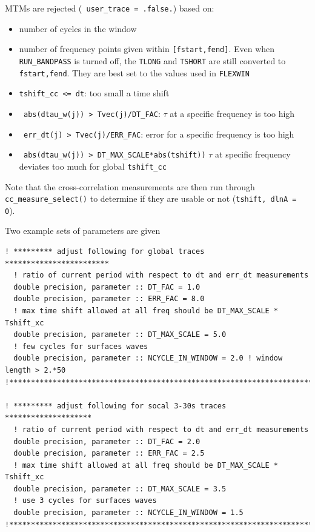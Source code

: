 \documentclass[11pt,titlepage,fleqn]{article}
\begin{document}
MTMs are rejected (\verb+ user_trace = .false.+) based on:
\begin{itemize}
\item number of cycles in the window
\item number of frequency points given within \verb+[fstart,fend]+. Even when \verb+RUN_BANDPASS+ is turned off, the \verb+TLONG+ and \verb+TSHORT+ are still converted to \verb+fstart,fend+. They are best set to the values used in \verb+FLEXWIN+ 
\item \verb+tshift_cc <= dt+: too small a time shift
\item \verb+ abs(dtau_w(j)) > Tvec(j)/DT_FAC+: $\tau$ at a specific frequency is too high
\item \verb+ err_dt(j) > Tvec(j)/ERR_FAC+: error for a specific frequency is too high 
\item \verb+ abs(dtau_w(j)) > DT_MAX_SCALE*abs(tshift))+ $\tau$ at specific frequency deviates too much for global \verb+tshift_cc+
\end{itemize}
Note that the cross-correlation measurements are then run through \verb+cc_measure_select()+ to determine if they are
usable or not (\verb+tshift, dlnA = 0+).

Two example sets of parameters are given 
%
\begin{verbatim}
! ********* adjust following for global traces ************************
  ! ratio of current period with respect to dt and err_dt measurements
  double precision, parameter :: DT_FAC = 1.0  
  double precision, parameter :: ERR_FAC = 8.0
  ! max time shift allowed at all freq should be DT_MAX_SCALE * Tshift_xc
  double precision, parameter :: DT_MAX_SCALE = 5.0
  ! few cycles for surfaces waves
  double precision, parameter :: NCYCLE_IN_WINDOW = 2.0 ! window length > 2.*50
!***********************************************************************

! ********* adjust following for socal 3-30s traces ********************
  ! ratio of current period with respect to dt and err_dt measurements
  double precision, parameter :: DT_FAC = 2.0
  double precision, parameter :: ERR_FAC = 2.5 
  ! max time shift allowed at all freq should be DT_MAX_SCALE * Tshift_xc
  double precision, parameter :: DT_MAX_SCALE = 3.5
  ! use 3 cycles for surfaces waves
  double precision, parameter :: NCYCLE_IN_WINDOW = 1.5
!***********************************************************************
\end{verbatim}

\end{document}
